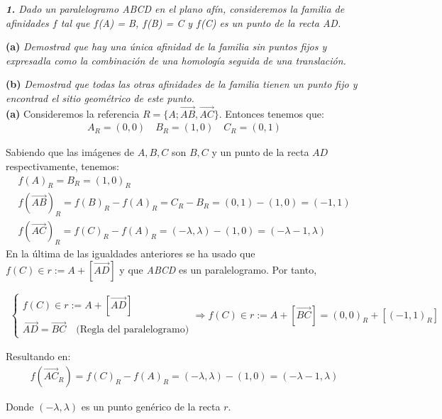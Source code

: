 \textit{\textbf{1. } Dado un paralelogramo \textit{ABCD} en el plano afín, consideremos la familia de afinidades $f$ tal que $f$(\textit{A}) = \textit{B}, $f$(\textit{B}) = \textit{C} y $f$(\textit{C}) es un punto de la recta \textit{AD}.}

\textbf{(a) } \textit{Demostrad que hay una única afinidad de la familia sin puntos fijos y expresadla como la combinación de una homología seguida de una translación.}

\textbf{(b) } \textit{Demostrad que todas las otras afinidades de la familia tienen un punto fijo y encontrad el sitio geométrico de este punto.}
\\

\textbf{(a) } Consideremos la referencia $R = \{A; \Vec{AB}, \Vec{AC}\}$. Entonces tenemos que: 
\begin{gather*}
    A_R = (0, 0) \quad B_R = (1, 0) \quad C_R = (0, 1)
\end{gather*}

Sabiendo que las imágenes de $A, B, C$ son $B, C$ y un punto de la recta $AD$ respectivamente, tenemos:
\begin{gather*}
    f(A)_R = B_R = (1, 0)_R \\
    f(\Vec{AB})_R = f(B)_R - f(A)_R = C_R - B_R = (0, 1) - (1, 0) = (-1 ,1) \\
    f(\Vec{AC})_R = f(C)_R - f(A)_R = (-\lambda, \lambda) - (1, 0) = (-\lambda - 1, \lambda)
\end{gather*}
En la última de las igualdades anteriores se ha usado que $f(C) \in r := A + [\Vec{AD}]$ y que \textit{ABCD} es un paralelogramo. Por tanto,

\begin{gather*}
    \begin{cases}
    f(C) \in r := A + [\Vec{AD}]\\
    \Vec{AD} = \Vec{BC} \quad \text{(Regla del paralelogramo)}
    \end{cases}
    \Longrightarrow
    f(C) \in r := A + [\Vec{BC}] = (0,0)_R + [(-1,1)_R]
\end{gather*}

\vspace{0.5cm}
Resultando en:
\begin{gather*}
    f(\Vec{AC}_R) = f(C)_R - f(A)_R = (-\lambda, \lambda) - (1, 0) = (-\lambda - 1, \lambda)
\end{gather*}

Donde $(-\lambda, \lambda)$ es un punto genérico de la recta $r$.


